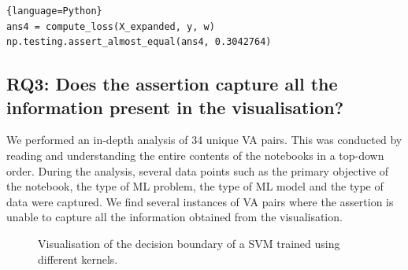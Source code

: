 \documentclass[conference]{IEEEtran}
\begin{document}
\begin{lstlisting}[caption={Assertion to check that the loss of the model is similar to the specified value.}, label={lst:np-almost-equal}]{language=Python}
ans4 = compute_loss(X_expanded, y, w)
np.testing.assert_almost_equal(ans4, 0.3042764) 
\end{lstlisting}

\subsection{RQ3: Does the assertion capture all the information present in the visualisation?}\label{sec:result-rq2-p3}

We performed an in-depth analysis of 34 unique VA pairs. This was conducted by reading and understanding the entire contents of the notebooks in a top-down order. During the analysis, several data points such as the primary objective of the notebook, the type of ML problem, the type of ML model and the type of data were captured. We find several instances of VA pairs where the assertion is unable to capture all the information obtained from the visualisation.

\begin{figure}
  \hfill
  \caption{Visualisation of the decision boundary of a SVM trained using different kernels.}\label{fig:svm}
\end{figure}
\end{document}
